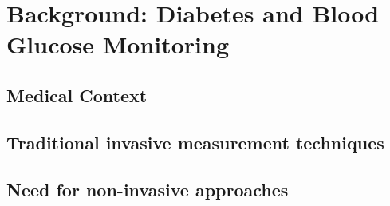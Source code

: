 
\chapter{Background: Diabetes and Blood Glucose Monitoring}
\label{cha:Background Diabetes and Blood Glucose Monitoring}

\section{Medical Context}
\label{sec:Medical context}

\section{Traditional invasive measurement techniques}
\label{sec:Traditional invasive measurement techniques}

\section{Need for non-invasive approaches}
\label{sec:Need for non-invasive approaches}
